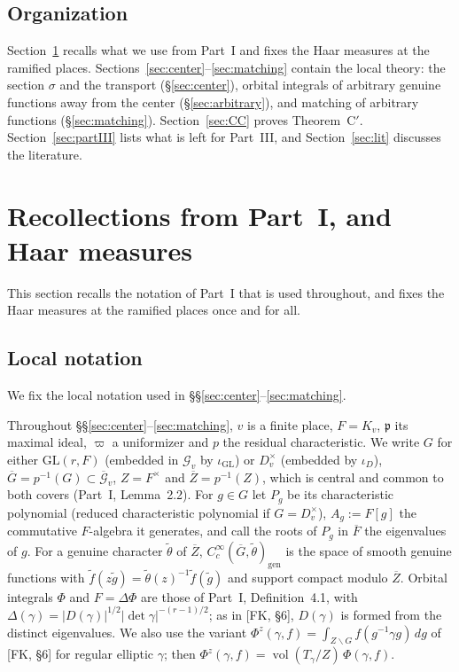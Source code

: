 \documentclass[12pt]{article}
\newcommand{\ov}[1]{\overline{#1}}
\newcommand{\fp}{\mathfrak{p}}
\newcommand{\gen}{\mathrm{gen}}
\newcommand{\vol}{\operatorname{vol}}
\newcommand{\GL}{\mathrm{GL}}
\newcommand{\Gb}{\ov{G}}
\newcommand{\Zb}{\ov{Z}}
\newcommand{\cG}{\mathcal{G}}
\newcommand{\cGb}{\ov{\mathcal{G}}}
\newcommand{\iD}{\iota_D}
\newcommand{\iG}{\iota_{\GL}}
\newcommand{\sg}{\sigma}
\theoremstyle{plain}
\theoremstyle{definition}
\begin{document}
\subsection{Organization}
Section~\ref{sec:recall} recalls what we use from Part~I and fixes the Haar measures at the ramified places. Sections~\ref{sec:center}--\ref{sec:matching} contain the local theory: the section $\sg$ and the transport (\S\ref{sec:center}), orbital integrals of arbitrary genuine functions away from the center (\S\ref{sec:arbitrary}), and matching of arbitrary functions (\S\ref{sec:matching}). Section~\ref{sec:CC} proves Theorem~C$'$. Section~\ref{sec:partIII} lists what is left for Part~III, and Section~\ref{sec:lit} discusses the literature.

\section{Recollections from Part~I, and Haar measures}\label{sec:recall}
This section recalls the notation of Part~I that is used throughout, and fixes the Haar measures at the ramified places once and for all.

\subsection{Local notation}\label{subsec:localnotation}
We fix the local notation used in \S\S\ref{sec:center}--\ref{sec:matching}.

Throughout \S\S\ref{sec:center}--\ref{sec:matching}, $v$ is a finite place, $F=K_v$, $\fp$ its maximal ideal, $\varpi$ a uniformizer and $p$ the residual characteristic. We write $G$ for either $\GL(r,F)$ (embedded in $\cG_v$ by $\iG$) or $D_v^\times$ (embedded by $\iD$), $\Gb=p^{-1}(G)\subset\cGb_v$, $Z=F^\times$ and $\Zb=p^{-1}(Z)$, which is central and common to both covers (Part~I, Lemma~2.2). For $g\in G$ let $P_g$ be its characteristic polynomial (reduced characteristic polynomial if $G=D_v^\times$), $A_g:=F[g]$ the commutative $F$-algebra it generates, and call the roots of $P_g$ in $\ov F$ the eigenvalues of $g$. For a genuine character $\tilde\theta$ of $\Zb$, $C_c^\infty(\Gb,\tilde\theta)_\gen$ is the space of smooth genuine functions with $\tilde f(z\tilde g)=\tilde\theta(z)^{-1}\tilde f(\tilde g)$ and support compact modulo $\Zb$. Orbital integrals $\Phi$ and $F=\Delta\Phi$ are those of Part~I, Definition~4.1, with $\Delta(\gamma)=|D(\gamma)|^{1/2}|\det\gamma|^{-(r-1)/2}$; as in [FK, \S6], $D(\gamma)$ is formed from the distinct eigenvalues. We also use the variant $\Phi^z(\gamma,f)=\int_{Z\backslash G}f(g^{-1}\gamma g)\,dg$ of [FK, \S6] for regular elliptic $\gamma$; then $\Phi^z(\gamma,f)=\vol(T_\gamma/Z)\,\Phi(\gamma,f)$.
\end{document}
